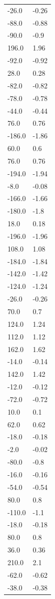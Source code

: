 \begin{longtable}{ll}
-26.0 & -0.26 \\
-88.0 & -0.88 \\
-90.0 & -0.9 \\
196.0 & 1.96 \\
-92.0 & -0.92 \\
28.0 & 0.28 \\
-82.0 & -0.82 \\
-78.0 & -0.78 \\
-44.0 & -0.44 \\
76.0 & 0.76 \\
-186.0 & -1.86 \\
60.0 & 0.6 \\
76.0 & 0.76 \\
-194.0 & -1.94 \\
-8.0 & -0.08 \\
-166.0 & -1.66 \\
-180.0 & -1.8 \\
18.0 & 0.18 \\
-196.0 & -1.96 \\
108.0 & 1.08 \\
-184.0 & -1.84 \\
-142.0 & -1.42 \\
-124.0 & -1.24 \\
-26.0 & -0.26 \\
70.0 & 0.7 \\
124.0 & 1.24 \\
112.0 & 1.12 \\
162.0 & 1.62 \\
-14.0 & -0.14 \\
142.0 & 1.42 \\
-12.0 & -0.12 \\
-72.0 & -0.72 \\
10.0 & 0.1 \\
62.0 & 0.62 \\
-18.0 & -0.18 \\
-2.0 & -0.02 \\
-80.0 & -0.8 \\
-16.0 & -0.16 \\
-54.0 & -0.54 \\
80.0 & 0.8 \\
-110.0 & -1.1 \\
-18.0 & -0.18 \\
80.0 & 0.8 \\
36.0 & 0.36 \\
210.0 & 2.1 \\
-62.0 & -0.62 \\
-38.0 & -0.38 \\

\end{longtable}
